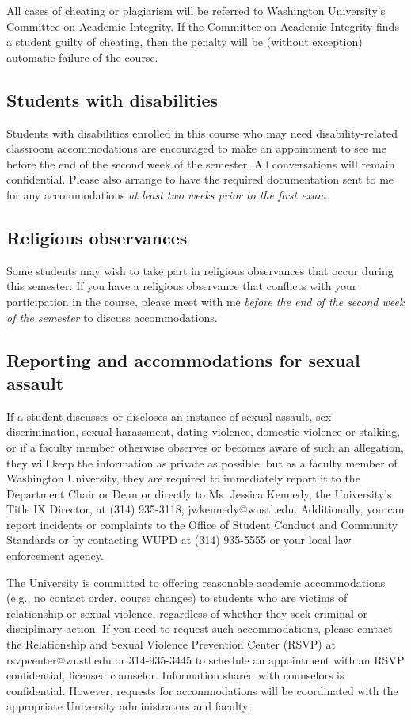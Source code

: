 \documentclass[11pt]{article}
\begin{document}
\noindent All cases of cheating or plagiarism will be referred to Washington
University's Committee on Academic Integrity. If the Committee on
Academic Integrity finds a student guilty of cheating, then the
penalty will be (without exception) automatic failure of the course.

\subsection*{Students with disabilities}

Students with disabilities enrolled in this course who may need
disability-related classroom accommodations are encouraged to make an
appointment to see me before the end of the second week of the
semester.  All conversations will remain confidential. Please also
arrange to have the required documentation sent to me for any
accommodations \emph{at least two weeks prior to the first exam.}

\subsection*{Religious observances}

Some students may wish to take part in religious observances that
occur during this semester. If you have a religious observance
that conflicts with your participation in the course, please meet with
me \emph{before the end of the second week of the semester} to discuss
accommodations.


\subsection*{Reporting and accommodations for sexual assault}

If a student discusses or discloses an instance of sexual assault, sex discrimination, sexual harassment, dating violence, domestic violence or stalking, or if a faculty member otherwise observes or becomes aware of such an allegation, they will keep the information as private as possible, but as a faculty member of Washington University, they are required to immediately report it to the Department Chair or Dean or directly to Ms. Jessica Kennedy, the University’s Title IX Director, at (314) 935-3118, jwkennedy@wustl.edu.  Additionally, you can report incidents or complaints to the Office of Student Conduct and Community Standards or by contacting WUPD at (314) 935-5555 or your local law enforcement agency. 

The University is committed to offering reasonable academic accommodations (e.g., no contact order, course changes) to students who are victims of relationship or sexual violence, regardless of whether they seek criminal or disciplinary action.  If you need to request such accommodations, please contact the Relationship and Sexual Violence Prevention Center (RSVP) at rsvpcenter@wustl.edu or 314-935-3445 to schedule an appointment with an RSVP confidential, licensed counselor. Information shared with counselors is confidential. However, requests for accommodations will be coordinated with the appropriate University administrators and faculty.  
\end{document}
